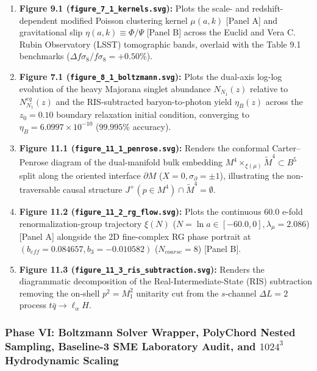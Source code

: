 \documentclass[aps,prd,onecolumn,superscriptaddress,nofootinbib,longbibliography,10pt]{revtex4-2}
\begin{document}
\begin{enumerate}
  
\item \textbf{Figure 9.1 (\texttt{figure_7_1_kernels.svg}):} Plots the scale- and redshift-dependent modified Poisson clustering kernel \(\mu(a,k)\) [Panel A] and gravitational slip \(\eta(a,k) \equiv \Phi/\Psi\) [Panel B] across the Euclid and Vera C. Rubin Observatory (LSST) tomographic bands, overlaid with the Table 9.1 benchmarks (\(\Delta f\sigma_8/f\sigma_8 = +0.50\%\)).
  
\item \textbf{Figure 7.1 (\texttt{figure_8_1_boltzmann.svg}):} Plots the dual-axis log-log evolution of the heavy Majorana singlet abundance \(N_{N_1}(z)\) relative to \(N_{N_1}^{eq}(z)\) and the RIS-subtracted baryon-to-photon yield \(\eta_B(z)\) across the \(z_0 = 0.10\) boundary relaxation initial condition, converging to \(\eta_B = 6.0997 \times 10^{-10}\) (\(99.995\%\) accuracy).
  
\item \textbf{Figure 11.1 (\texttt{figure_11_1_penrose.svg}):} Renders the conformal Carter–Penrose diagram of the dual-manifold bulk embedding \(M^4 \times_{\xi(\mu)} \tilde{M}^4 \subset B^5\) split along the oriented interface \(\partial M\) (\(X = 0, \sigma_{\partial} = \pm 1\)), illustrating the non-traversable causal structure \(J^+(p \in M^4) \cap \tilde{M}^4 = \emptyset\).
  
\item \textbf{Figure 11.2 (\texttt{figure_11_2_rg_flow.svg}):} Plots the continuous \(60.0\) e-fold renormalization-group trajectory \(\xi(N)\) (\(N = \ln a \in [-60.0, 0], \lambda_\mu = 2.086\)) [Panel A] alongside the 2D fine-complex RG phase portrait at \((b_{eff} = 0.084657, b_3 = -0.010582)\) (\(N_{coarse} = 8\)) [Panel B].
  
\item \textbf{Figure 11.3 (\texttt{figure_11_3_ris_subtraction.svg}):} Renders the diagrammatic decomposition of the Real-Intermediate-State (RIS) subtraction removing the on-shell \(p^2 = M_1^2\) unitarity cut from the \(s\)-channel \(\Delta L = 2\) process \(t\bar{q} \to \ell_\alpha H\).

\end{enumerate}




\subsubsection*{Phase VI: Boltzmann Solver Wrapper, PolyChord Nested Sampling, Baseline-3 SME Laboratory Audit, and \(1024^3\) Hydrodynamic Scaling}
\end{document}
